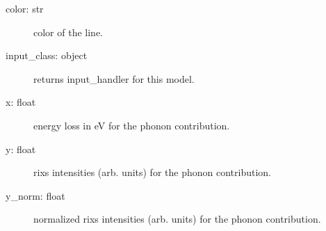 \documentclass[letterpaper,10pt,english]{sphinxmanual}
\begin{document}
\begin{fulllineitems}
\begin{description}
\begin{description}
\item[{color: str}] \leavevmode
color of the line.

\item[{input\_class: object}] \leavevmode
returns input\_handler for this model.

\item[{x: float}] \leavevmode
energy loss in eV for the phonon contribution.

\item[{y: float}] \leavevmode
rixs intensities (arb. units) for the phonon contribution.

\item[{y\_norm: float}] \leavevmode
normalized rixs intensities (arb. units) for the phonon contribution.

\end{description}

\end{description}

\end{fulllineitems}

\end{document}
